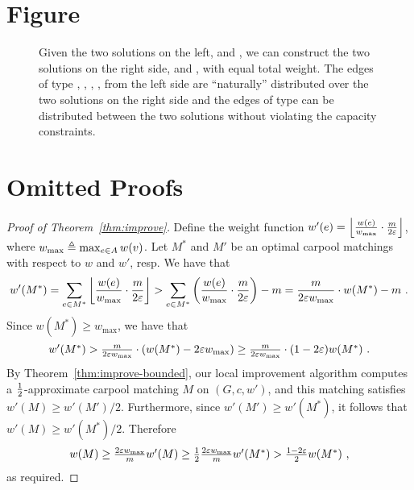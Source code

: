 

\section{Figure}

\begin{figure}[h]
\centering

\caption[]{%
Given the two solutions on the left, 
 and , we
can construct the two solutions on the right side,
 and , with equal total weight.
The edges of type 
, 
, 
, 
, 
from the left side are ``naturally'' distributed over the two solutions on the
right side and the edges of type  can be distributed between the
two solutions without violating the capacity constraints.
}
\label{fig:sub}
\end{figure}



\section{Omitted Proofs}
\label{sec:omitted}

\begin{proof}[Proof of Theorem~\ref{thm:improve}]
Define the weight function $w'(e)
= \left\lfloor \frac{w(e)}{w_{\max}} \cdot \frac{m}{2\varepsilon} \right\rfloor$, where
$w_{\max} \triangleq \max_{e \in A} w(v)$.
%
Let $M^*$ and $M'$ be an optimal carpool matchings with respect to $w$
and $w'$, resp.  We have that
\[
w'(M^*)
=    \sum_{e \in M^*} \left\lfloor \frac{w(e)}{w_{\max}} \cdot \frac{m}{2\varepsilon} \right\rfloor
>    \sum_{e \in M^*} \left(  \frac{w(e)}{w_{\max}} \cdot \frac{m}{2\varepsilon}  \right) - m
=    \frac{m}{2\varepsilon w_{\max}} \cdot w(M^*) - m
~.
\]
Since $w(M^*) \geq w_{\max}$, we have that 
\[
\textstyle
w'(M^*)
>    \frac{m}{2\varepsilon w_{\max}} \cdot (w(M^*) - 2\varepsilon w_{\max})
\geq \frac{m}{2\varepsilon w_{\max}} \cdot (1 - 2\varepsilon) w(M^*)
~.
\]
By Theorem~\ref{thm:improve-bounded}, our local improvement algorithm computes a
$\frac{1}{2}$-approximate carpool matching $M$ on $(G, c, w')$, and this
matching satisfies $w'(M) \geq w'(M')/2$.  Furthermore, since
$w'(M') \geq w'(M^*)$, it follows that $w'(M) \geq w'(M^*)/2$.
Therefore
\[
\textstyle
w(M)
\geq \frac{2\varepsilon w_{\max}}{m} w'(M) 
\geq \frac{1}{2} \frac{2\varepsilon w_{\max}}{m} w'(M^*)
>    \frac{1-2\varepsilon}{2} w(M^*)
~,
\]
as required.
\end{proof}

